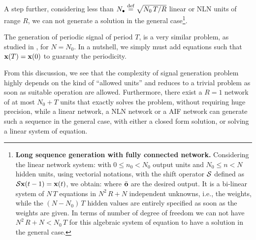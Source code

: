A step further, considering less than $N_\bullet \stackrel {\rm def}{=} \sqrt{N_0\,T/R}$ linear or NLN units of range $R$, we can not generate a solution in the general case\footnote{{\bf Long sequence generation with fully connected network.} Considering the linear network system:
with $0 \leq n_0 < N_0$ output units and $N_0 \leq n < N$ hidden units, using vectorial notations, with the shift operator ${\cal S}$ defined as ${\cal S} {\bf x}(t-1) = {\bf x}(t)$, we obtain:
where $\bar{\bf o}$ are the desired output. It is a bi-linear system of $N\,T$ equations in $N^2\,R + N$ independent unknowns, i.e., the weights, while the $(N-N_0)\,T$ hidden values are entirely specified as soon as the weights are given. In terms of number of degree of freedom we can not have $N^2\,R + N < N_0 \,T$ for this algebraic system of equation to have a solution in the general case.}.

The generation of periodic signal of period $T$, is a very similar problem, as studied in \cite{rostro-gonzalez-cessac-etal:10}, for $N=N_0$. In a nutshell, we simply must add equations such that ${\bf x}(T) = {\bf x}(0)$ to guaranty the periodicity.

From this discussion, we see that the complexity of signal generation problem highly depends on the kind of ``allowed units'' and reduces to a trivial problem as soon as suitable operation are allowed. Furthermore, there exist a $R=1$ network of at most $N_0 + T$ units that exactly solves the problem, without requiring huge precision, while a linear network, a NLN network or a AIF network can generate such a sequence in the general case, with either a closed form solution, or solving a linear system of equation.
